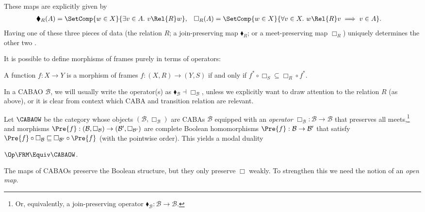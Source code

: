 These maps are explicitly given by
\begin{align*}
  \blacklozenge_R(A) &= \SetComp{w \in X}{\exists v \in A.\ v \Rel{R} w}, 
                     &
  \Box_R(A) &= \SetComp{w \in X}{\forall v \in X.\ w \Rel{R} v \implies v \in A}.
\end{align*}
Having one of these three pieces of data (the relation $R$; a
join-preserving map $\blacklozenge_R$; or a meet-preserving map
$\Box_R$) uniquely determines the other two \cite{kavvos_2024a}.

It is possible to define morphisms of frames purely in terms of operators:
\begin{lemma}
  \label{lemma:frm-morphism-box}
  A function $f : X \to Y$ is a morphism of frames \(f : (X, R) \to (Y, S)\) if
  and only if \(f^* \circ \Box_S \subseteq \Box_R \circ f^*\).
\end{lemma}

\begin{notation}
  In a CABAO \(\mathcal{B}\), we will usually write the operator(s) as
  \(\blacklozenge_{\mathcal{B}} \dashv \Box_{\mathcal{B}}\), unless we
  explicitly want to draw attention to the relation \(R\) (as above),
  or it is clear from context which CABA and transition relation are
  relevant.
\end{notation}

Let $\CABAOW$ be the category whose objects
$(\mathcal{B}, \Box_\mathcal{B})$ are CABAs $\mathcal{B}$ equipped
with an \emph{operator}
$\Box_{\mathcal{B}} : \mathcal{B} \to \mathcal{B}$ that preserves all
meets,\footnote{Or, equivalently, a join-preserving operator
  $\blacklozenge_{\mathcal{B}} : \mathcal{B} \to \mathcal{B}$.} and
morphisms
$\Pre{f} : (\mathcal{B}, \Box_\mathcal{B}) \to (\mathcal{B}',
\Box_{\mathcal{B}'})$ are complete Boolean homomorphisms
$\Pre{f} : \mathcal{B} \to \mathcal{B}'$ that satisfy
$\Pre{f} \circ \Box_\mathcal{B} \sqsubseteq \Box_{\mathcal{B}'} \circ
\Pre{f}$ (with the pointwise order). This yields a modal duality

\begin{theorem}
  \label{theorem:thomason}
  \(\Op\FRM \Equiv \CABAOW\).
\end{theorem}

The maps of CABAOs preserve the Boolean structure, but they only preserve
$\Box$ weakly. To strengthen this we need the notion of an \emph{open
map}.

